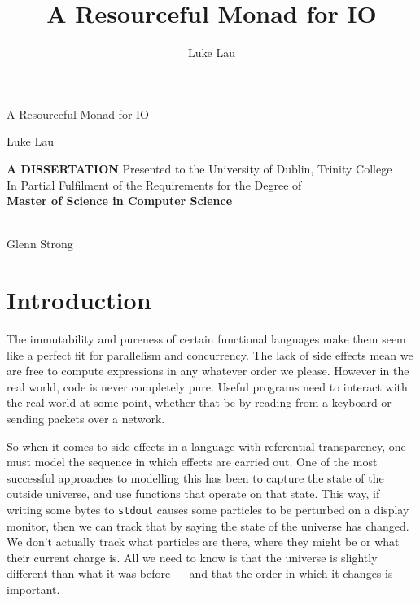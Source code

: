 \documentclass{report}
\begin{document}
\newcommand{\llbracket}{[\![}
\newcommand{\rrbracket}{]\!]}
\newcommand{\IO}{\mathsf{IO}}
\newcommand{\bind}{>\!\!>\!\!=} \newcommand{\concbind}{>\!\!>\!>\!\!=}
\newcommand{\subtyp}{\geq:}
\newcommand{\notsubtyp}{\ngeq:}
\newcommand{\lift}[1]{\ensuremath{\llbracket#1\rrbracket}}
\newcommand{\use}[2]{\ensuremath{\llbracket#2\rrbracket_{#1}}}
\newcommand{\ftv}{\operatorname{FTV}}
\newcommand{\fv}{\operatorname{FV}}
\newtheorem{theorem}{Theorem}
\newtheorem{lemma}{Lemma}

\author{Luke Lau}
\title{A Resourceful Monad for IO}
\begin{titlepage}
  \begin{center}
    {\Huge A Resourceful  Monad for IO}
    \vskip 0.25in
    \centerline{\Large Luke Lau}
    \vfill
    \large
    {
      {\uppercase{\Large \bf A Dissertation}}
      \vskip 0.2in
      Presented to the University of Dublin, Trinity College \\
      In Partial Fulfilment of the Requirements for the Degree of \\
      \vskip 0.2in
      {\bf Master of Science in Computer Science}
    }

    \vfill
  \end{center}

   \\
  Glenn Strong

\end{titlepage}

\tableofcontents

\chapter{Introduction}
The immutability and pureness of certain functional languages make them seem
like a perfect fit for parallelism and concurrency. The lack of side effects
mean we are free to compute expressions in any whatever order we please. However
in the real world, code is never completely pure. Useful programs need to
interact with the real world at some point, whether that be by reading from a
keyboard or sending packets over a network.

So when it comes to side effects in a language with referential transparency,
one must model the sequence in which effects are carried out. One of the most
successful approaches to modelling this has been to capture the state of the
outside universe, and use functions that operate on that state. This way, if
writing some bytes to \texttt{stdout} causes some particles to be perturbed on a
display monitor, then we can track that by saying the state of the universe has
changed. We don't actually track what particles are there, where they might
be or what their current charge is. All we need to know is that the universe is
slightly different than what it was before --- and that the order in which it
changes is important.
\end{document}
